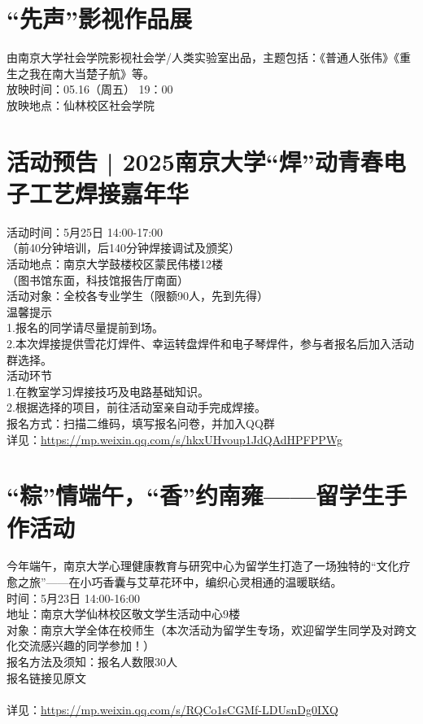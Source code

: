\documentclass[letterpaper, 12pt]{article}
\begin{document}
\begin{multicols}{2}
\section{“先声”影视作品展} %
由南京大学社会学院影视社会学/人类实验室出品，主题包括：《普通人张伟》《重生之我在南大当楚子航》等。
\\放映时间：05.16（周五）  19：00
\\放映地点：仙林校区社会学院
\\
\section{活动预告 | 2025南京大学“焊”动青春电子工艺焊接嘉年华} %
活动时间：5月25日 14:00-17:00
\\（前40分钟培训，后140分钟焊接调试及颁奖）
\\活动地点：南京大学鼓楼校区蒙民伟楼12楼
\\（图书馆东面，科技馆报告厅南面）
\\活动对象：全校各专业学生（限额90人，先到先得）
\\温馨提示
\\1.报名的同学请尽量提前到场。
\\2.本次焊接提供雪花灯焊件、幸运转盘焊件和电子琴焊件，参与者报名后加入活动群选择。
\\活动环节
\\1.在教室学习焊接技巧及电路基础知识。
\\2.根据选择的项目，前往活动室亲自动手完成焊接。
\\报名方式：扫描二维码，填写报名问卷，并加入QQ群
\\详见：\url{https://mp.weixin.qq.com/s/hkxUHvoup1JdQAdHPFPPWg}

\section{“粽”情端午，“香”约南雍——留学生手作活动} %
今年端午，南京大学心理健康教育与研究中心为留学生打造了一场独特的“文化疗愈之旅”——在小巧香囊与艾草花环中，编织心灵相通的温暖联结。
\\时间：5月23日 14:00-16:00
\\地址：南京大学仙林校区敬文学生活动中心9楼
\\对象：南京大学全体在校师生（本次活动为留学生专场，欢迎留学生同学及对跨文化交流感兴趣的同学参加！）
\\报名方法及须知：报名人数限30人
\\报名链接见原文
\\
\\详见：\url{https://mp.weixin.qq.com/s/RQCo1sCGMf-LDUsnDg0IXQ}


\end{multicols}
\end{document}
